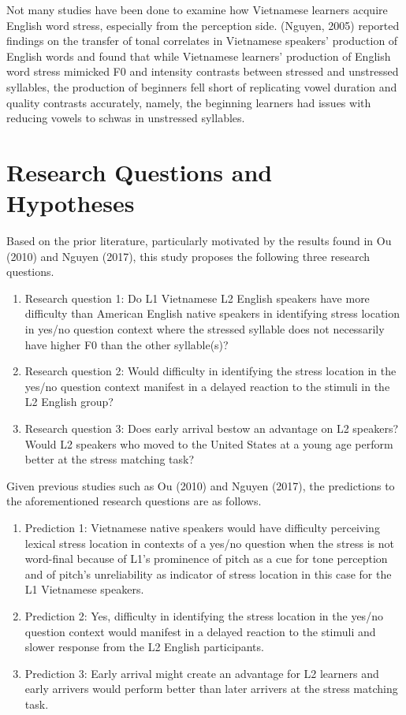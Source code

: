 \documentclass[a4paper]{article}
\begin{document}
Not many studies have been done to examine how Vietnamese learners acquire English word stress, especially from the perception side. (Nguyen, 2005) reported findings on the transfer of tonal correlates in Vietnamese speakers' production of English words and found that while Vietnamese learners' production of English word stress mimicked F0 and intensity contrasts between stressed and unstressed syllables, the production of beginners fell short of replicating vowel duration and quality contrasts accurately, namely, the beginning learners had issues with reducing vowels to schwas in unstressed syllables.

\section{Research Questions and Hypotheses}
\label{RQ}
Based on the prior literature, particularly motivated by the results found in Ou (2010) and Nguyen (2017), this study proposes the following three research questions.
\begin{enumerate}
  \item Research question 1: Do L1 Vietnamese L2 English speakers have more difficulty than American English native speakers in identifying stress location in yes/no question context where the stressed syllable does not necessarily have higher F0 than the other syllable(s)?
   \item Research question 2: Would difficulty in identifying the stress location in the yes/no question context manifest in a delayed reaction to the stimuli in the L2 English group?
  \item Research question 3: Does early arrival bestow an advantage on L2 speakers? Would L2 speakers who moved to the United States at a young age perform better at the stress matching task?
\end{enumerate}



Given previous studies such as Ou (2010) and Nguyen (2017), the predictions to the aforementioned research questions are as follows.
\begin{enumerate}
  \item Prediction 1: Vietnamese native speakers would have difficulty perceiving lexical stress location in contexts of a yes/no question when the stress is not word-final because of L1’s prominence of pitch as a cue for tone perception and of pitch's unreliability as indicator of stress location in this case for the L1 Vietnamese speakers.
   \item Prediction 2: Yes, difficulty in identifying the stress location in the yes/no question context would manifest in a delayed reaction to the stimuli and slower response from the L2 English participants.
   \item Prediction 3: Early arrival might create an advantage for L2 learners and early arrivers would perform better than later arrivers at the stress matching task.
\end{enumerate}
\end{document}
